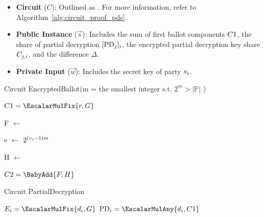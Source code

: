 \documentclass[lettersize,journal]{IEEEtran}
\theoremstyle{definition}
\begin{document}
\subsubsection{}\label{app:proof-pds}

\begin{itemize}
    \item \textbf{Circuit} ($C$): Outlined as \ProofPDSInformal{}. For more information, refer to Algorithm~\ref{alg:circuit_proof_pds}.
    \item \textbf{Public Instance} ($\vec{s}$): Includes the sum of first ballot components $C1{}$, the share of partial decryption $[\mathrm{PD}_{j}]_{i}$, the encrypted partial decryption key share $C_{j,i}$, and the difference $\Delta$.
    \item \textbf{Private Input} ($\vec{w}$): Includes the secret key of party $s_{i}$.
\end{itemize}



\begin{algorithm}[h!]
\caption{Circuit EncryptedBallot(m = the smallest integer s.t. $2^m > |\mathbb{P}|$ )}
\label{alg:circuit_proof_ballot}




\BlankLine

\Assert $C1 = \EscalarMulFix{r, \G}$\;

F $\leftarrow$ \;

e $\leftarrow$ $2^{(v_{i} - 1) m}$\;

H $\leftarrow$ \;

\Assert $C2 = \BabyAdd{F, H}$\;

\end{algorithm}


\begin{algorithm}[h!]
\caption{Circuit PartialDecryption}
\label{alg:circuit_proof_pd}


\BlankLine

\Assert $\PartialPublicKey{i} = \EscalarMulFix{\PartialSecretKey{i}, \G}$\;
\Assert $\PartialDecryptionFrom{i} = \EscalarMulAny{\PartialSecretKey{i}, \TotalA{}}$\;
\end{algorithm}
\end{document}
